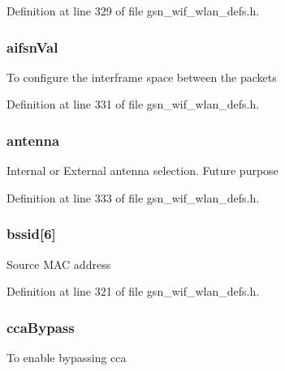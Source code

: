 Definition at line 329 of file gsn\_\-wif\_\-wlan\_\-defs.h.

\hypertarget{a00187_a8b5e8378081c1e22ff81c12ae15e1bc3}{
\subsubsection[{aifsnVal}]{ {\bf aifsnVal}}}
\label{a00187_a8b5e8378081c1e22ff81c12ae15e1bc3}
To configure the interframe space between the packets 

Definition at line 331 of file gsn\_\-wif\_\-wlan\_\-defs.h.

\hypertarget{a00187_ad84150bc4d20a5e841d834b269db9901}{
\subsubsection[{antenna}]{ {\bf antenna}}}
\label{a00187_ad84150bc4d20a5e841d834b269db9901}
Internal or External antenna selection. Future purpose 

Definition at line 333 of file gsn\_\-wif\_\-wlan\_\-defs.h.

\hypertarget{a00187_af1eb240ad4299a104d0bf3fddcabbb95}{
\subsubsection[{bssid}]{ {\bf bssid}\mbox{[}6\mbox{]}}}
\label{a00187_af1eb240ad4299a104d0bf3fddcabbb95}
Source MAC address 

Definition at line 321 of file gsn\_\-wif\_\-wlan\_\-defs.h.

\hypertarget{a00187_a159663bb9fdf56a642427fc865dec9e4}{
\subsubsection[{ccaBypass}]{ {\bf ccaBypass}}}
\label{a00187_a159663bb9fdf56a642427fc865dec9e4}
To enable bypassing cca 

